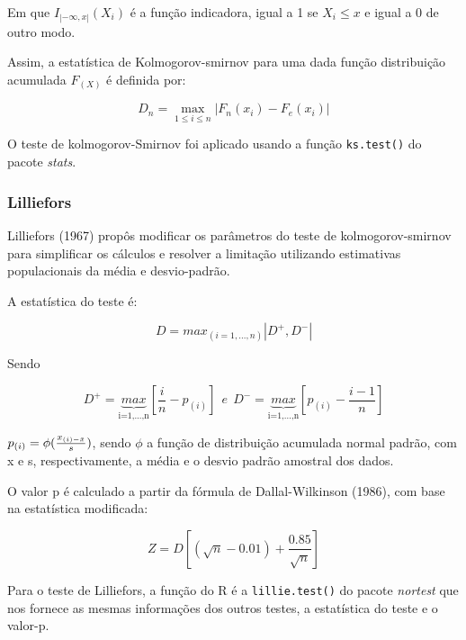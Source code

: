 \documentclass[a4paper,11pt]{article} %
\begin{document}
Em que $I_{|- \infty, x|}(X_{i})$ é a função indicadora, igual a 1 se $X_{i} \leq  x$ e igual a 0 de outro modo.

\vskip0.3cm
Assim, a  estatística de Kolmogorov-smirnov para uma dada função distribuição acumulada $F_{(X)}$ é definida por:

\begin{equation}
    D_{n} = \max_{1 \leq i \leq n} \left| F_{n}(x_i) - F_{e}(x_i) \right|
\end{equation}

O teste de kolmogorov-Smirnov foi aplicado usando a função \texttt{ks.test()} do pacote \textit{stats}. \vskip0.3cm

\subsubsection{Lilliefors}

Lilliefors (1967) propôs modificar os parâmetros do teste de kolmogorov-smirnov para simplificar os cálculos e resolver a limitação utilizando estimativas populacionais da média e desvio-padrão.\vskip0.3cm

A estatística do teste é:

\begin{equation}
   D = max_{(i=1,...,n)}|D^{+},D^{-}|
\end{equation}

Sendo

\begin{equation}
    D^{+} =   \underbrace{max}_{\mbox{i=1,...,n}}    {\left[\frac{i}{n} - p_{(i)}\right]} \ \ e \ \ D^{-} = \underbrace{max}_{\mbox{i=1,...,n}}  {\left[p_{(i)} - \frac{i-1}{n}\right]}
\end{equation}

$ p_{(i)}= \phi( \frac{x_{(i)-\Bar{x}}}{s} )$, sendo $\phi$ a função de distribuição acumulada normal padrão, com x e s, respectivamente, a média e o desvio padrão amostral dos dados.\vskip0.3cm


O valor p é calculado a partir da fórmula de Dallal-Wilkinson (1986), com base na estatística modificada:

\begin{equation}
    Z = D \left[(\sqrt{n} - 0.01) + \frac{0.85}{\sqrt{n}} \right]
\end{equation}


\vskip0.3cm


Para o teste de Lilliefors, a função do R é a \texttt{lillie.test()} do pacote \textit{nortest} que nos fornece as mesmas informações dos outros testes, a estatística do teste e o valor-p.\vskip0.3cm
\end{document}
